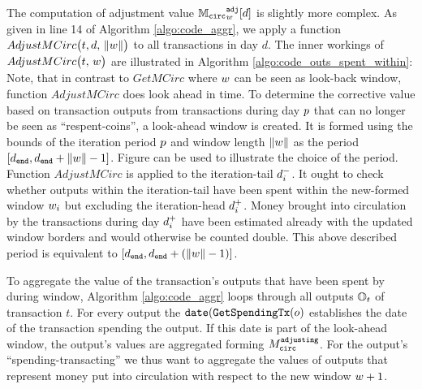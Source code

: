 The computation of adjustment value \({{\mathbb{M}_{\mathtt{circ}}}^{\mathtt{adj}}_{{w}}}[d]\) is slightly more complex. %
As given in line 14 of Algorithm \ref{algo:code_aggr}, we apply a function \(AdjustMCirc\bigl(t, d,\,{\lVert w \rVert}\bigr)\) to all transactions in day \(d\). %
The inner workings of \(AdjustMCirc\bigl(t,\,{w}\bigr)\) are illustrated in Algorithm \ref{algo:code_outs_spent_within}: %
Note, that in contrast to \(GetMCirc\) where \({w}\) can be seen as look-back window, function \(AdjustMCirc\) does look ahead in time. %
To determine the corrective value based on transaction outputs from transactions during day \({p}\) that can no longer be seen as ``respent-coins'', a look-ahead window is created. %
It is formed using the bounds of the iteration period \({p}\) and window length \({\lVert w \rVert}\) as the period \([d_{\mathtt{end}},d_{\mathtt{end}}+{\lVert w \rVert}-1]\). %
Figure  can be used to illustrate the choice of the period. %
Function \(AdjustMCirc\) is applied to the iteration-tail \({d_{{i}}^{-}}\). %
It ought to check whether outputs within the iteration-tail have been spent within the new-formed window \({w}_{{i}}\) but excluding the iteration-head \({d_{{i}}^{+}}\). %
Money brought into circulation by the transactions during day \({d_{{i}}^{+}}\) have been estimated already with the updated window borders and would otherwise be counted double. %
This above described period is equivalent to \([d_{\mathtt{end}},d_{\mathtt{end}}+({\lVert w \rVert}-1)]\). %

To aggregate the value of the transaction's outputs that have been spent by during window, Algorithm \ref{algo:code_aggr} loops through all outputs \({\mathbb{O}}_{t}\) of transaction \(t\). %
For every output the \(\mathtt{date}({\mathtt{GetSpendingTx}}(o)\) establishes the date of the transaction spending the output. %
If this date is part of the look-ahead window, the output's values are aggregated forming \({M_{\mathtt{circ}}^{\mathtt{adjusting}}}\). %
For the output's ``spending-transacting'' we thus want to aggregate the values of outputs that represent money put into circulation with respect to the new window \({w} + 1\). %






